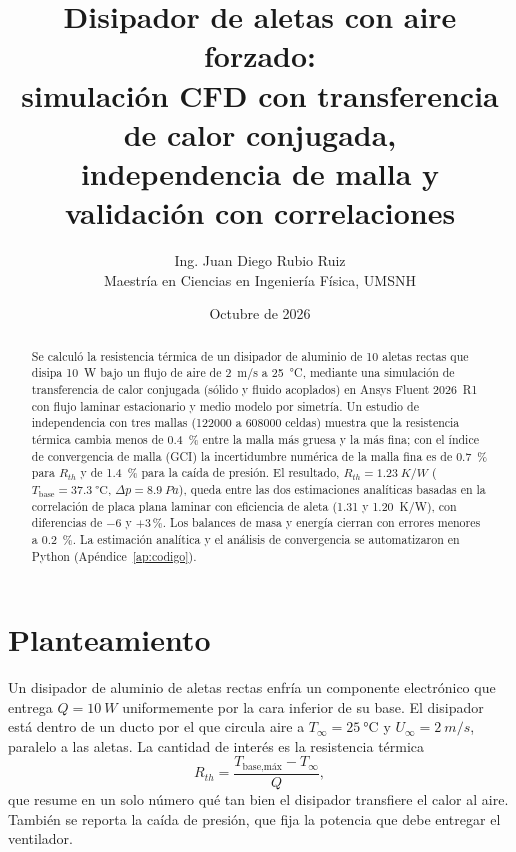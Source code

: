 \documentclass[11pt,letterpaper]{article}
\title{\textbf{Disipador de aletas con aire forzado:\\ simulación CFD con transferencia de calor conjugada,\\ independencia de malla y validación con correlaciones}}
\author{Ing. Juan Diego Rubio Ruiz\\\small Maestría en Ciencias en Ingeniería Física, UMSNH}
\date{Octubre de 2026}
\begin{document}
\maketitle
\begin{abstract}
Se calculó la resistencia térmica de un disipador de aluminio de 10 aletas rectas que disipa \SI{10}{W} bajo un flujo de aire de \SI{2}{m/s} a \SI{25}{\celsius}, mediante una simulación de transferencia de calor conjugada (sólido y fluido acoplados) en Ansys Fluent 2026~R1 con flujo laminar estacionario y medio modelo por simetría. Un estudio de independencia con tres mallas (\num{122000} a \num{608000} celdas) muestra que la resistencia térmica cambia menos de \SI{0.4}{\%} entre la malla más gruesa y la más fina; con el índice de convergencia de malla (GCI) la incertidumbre numérica de la malla fina es de \SI{0.7}{\%} para $R_{th}$ y de \SI{1.4}{\%} para la caída de presión. El resultado, $R_{th}=\SI{1.23}{K/W}$ ($T_{\text{base}}=\SI{37.3}{\celsius}$, $\Delta p=\SI{8.9}{Pa}$), queda entre las dos estimaciones analíticas basadas en la correlación de placa plana laminar con eficiencia de aleta (\SI{1.31}{} y \SI{1.20}{K/W}), con diferencias de $-6$ y $+3\,\%$. Los balances de masa y energía cierran con errores menores a \SI{0.2}{\%}. La estimación analítica y el análisis de convergencia se automatizaron en Python (Apéndice~\ref{ap:codigo}).
\end{abstract}

\section{Planteamiento}
Un disipador de aluminio de aletas rectas enfría un componente electrónico que entrega $Q=\SI{10}{W}$ uniformemente por la cara inferior de su base. El disipador está dentro de un ducto por el que circula aire a $T_\infty=\SI{25}{\celsius}$ y $U_\infty=\SI{2}{m/s}$, paralelo a las aletas. La cantidad de interés es la resistencia térmica
\begin{equation}
R_{th}=\frac{T_{\text{base,máx}}-T_\infty}{Q},
\end{equation}
que resume en un solo número qué tan bien el disipador transfiere el calor al aire. También se reporta la caída de presión, que fija la potencia que debe entregar el ventilador.
\end{document}
